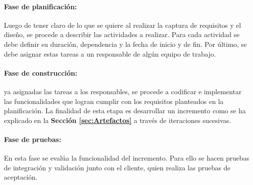 \paragraph{Fase de planificación: } Luego de tener claro de lo que se quiere al realizar la captura de requisitos y el diseño, se procede a describir las actividades a realizar. Para cada actividad se debe definir su duración, dependencia y la fecha de inicio y de fin. Por último, se debe asignar estas tareas a un responsable de algún equipo de trabajo. 

\paragraph{Fase de construcción: } ya asignadas las tareas a los responsables, se procede a codificar e implementar las funcionalidades que logran cumplir con los requisitos planteados en la planificación. La finalidad de esta etapa es desarrollar un incremento como se ha explicado en la \textbf{Sección \ref{sec:Artefactos}} a través de iteraciones sucesivas.

\paragraph{Fase de pruebas: } En esta fase se evalúa la funcionalidad del incremento. Para ello se hacen pruebas de integración y validación junto con el cliente, quien realiza las pruebas de aceptación.
